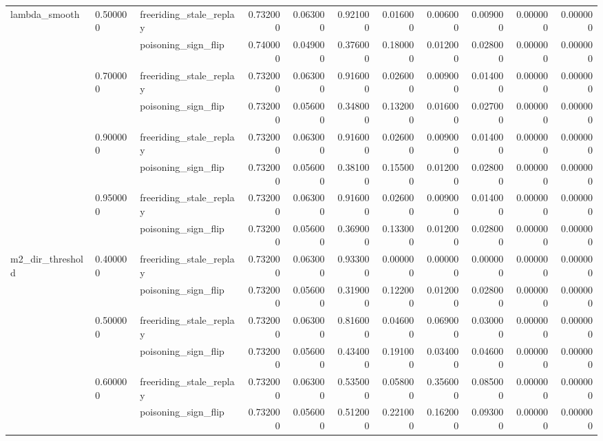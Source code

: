 \begin{tabular}{lllrrrrrrrr}
\cline{1-11} \cline{2-11}
\multirow[t]{8}{*}{lambda_smooth} & \multirow[t]{2}{*}{0.500000} & freeriding_stale_replay & 0.732000 & 0.063000 & 0.921000 & 0.016000 & 0.006000 & 0.009000 & 0.000000 & 0.000000 \\
 &  & poisoning_sign_flip & 0.740000 & 0.049000 & 0.376000 & 0.180000 & 0.012000 & 0.028000 & 0.000000 & 0.000000 \\
\cline{2-11}
 & \multirow[t]{2}{*}{0.700000} & freeriding_stale_replay & 0.732000 & 0.063000 & 0.916000 & 0.026000 & 0.009000 & 0.014000 & 0.000000 & 0.000000 \\
 &  & poisoning_sign_flip & 0.732000 & 0.056000 & 0.348000 & 0.132000 & 0.016000 & 0.027000 & 0.000000 & 0.000000 \\
\cline{2-11}
 & \multirow[t]{2}{*}{0.900000} & freeriding_stale_replay & 0.732000 & 0.063000 & 0.916000 & 0.026000 & 0.009000 & 0.014000 & 0.000000 & 0.000000 \\
 &  & poisoning_sign_flip & 0.732000 & 0.056000 & 0.381000 & 0.155000 & 0.012000 & 0.028000 & 0.000000 & 0.000000 \\
\cline{2-11}
 & \multirow[t]{2}{*}{0.950000} & freeriding_stale_replay & 0.732000 & 0.063000 & 0.916000 & 0.026000 & 0.009000 & 0.014000 & 0.000000 & 0.000000 \\
 &  & poisoning_sign_flip & 0.732000 & 0.056000 & 0.369000 & 0.133000 & 0.012000 & 0.028000 & 0.000000 & 0.000000 \\
\cline{1-11} \cline{2-11}
\multirow[t]{6}{*}{m2_dir_threshold} & \multirow[t]{2}{*}{0.400000} & freeriding_stale_replay & 0.732000 & 0.063000 & 0.933000 & 0.000000 & 0.000000 & 0.000000 & 0.000000 & 0.000000 \\
 &  & poisoning_sign_flip & 0.732000 & 0.056000 & 0.319000 & 0.122000 & 0.012000 & 0.028000 & 0.000000 & 0.000000 \\
\cline{2-11}
 & \multirow[t]{2}{*}{0.500000} & freeriding_stale_replay & 0.732000 & 0.063000 & 0.816000 & 0.046000 & 0.069000 & 0.030000 & 0.000000 & 0.000000 \\
 &  & poisoning_sign_flip & 0.732000 & 0.056000 & 0.434000 & 0.191000 & 0.034000 & 0.046000 & 0.000000 & 0.000000 \\
\cline{2-11}
 & \multirow[t]{2}{*}{0.600000} & freeriding_stale_replay & 0.732000 & 0.063000 & 0.535000 & 0.058000 & 0.356000 & 0.085000 & 0.000000 & 0.000000 \\
 &  & poisoning_sign_flip & 0.732000 & 0.056000 & 0.512000 & 0.221000 & 0.162000 & 0.093000 & 0.000000 & 0.000000 \\

\end{tabular}

